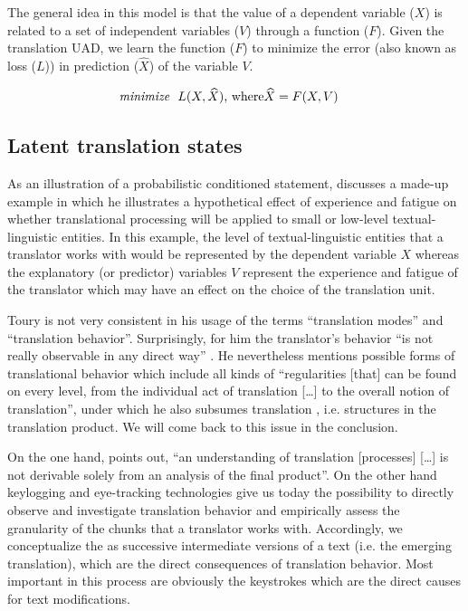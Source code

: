 \documentclass[output=paper]{LSP/langsci}
\begin{document}
The general idea in this model is that the value of a dependent variable ($X$) is related to a set of independent variables ($V$) through a function ($F$). Given the translation UAD, we learn the function ($F$) to minimize the error (also known as  loss ($L$)) in prediction ($\widehat{X}$) of the variable $V$.

	
\begin{eqnarray}
\label{carl-schaeffer:eqn:tp}
\text{\itshape minimize} ~~ L(X, \widehat {X}) \mbox{, where} & \widehat {X}  =  F(X,V)
\end{eqnarray}


\subsection{Latent translation states}
\label{carl-schaeffer:sec:2.2}

As an illustration of a probabilistic conditioned statement, \citet{Toury2004} discusses a made-up example in which he illustrates a hypothetical effect of experience and fatigue on whether translational processing will be applied to small or low-level textual-linguistic entities. In this example, the level of textual-linguistic entities that a translator works with would be represented by the dependent variable  $X$ whereas the explanatory (or predictor) variables  $V$ represent
the experience and fatigue of the translator which may have an effect on the choice of the translation unit. 

Toury is not very consistent in his usage of the terms ``translation modes'' and ``translation behavior''. Surprisingly, for him the translator's behavior ``is not really observable in any direct way'' \citep[26]{Toury2004}. He nevertheless mentions possible forms of translational behavior which include all kinds of ``regularities [that] can be found on every level, from the individual act of translation [\ldots] to the overall notion of translation'', under which he also subsumes translation , i.e. structures in the translation product. We will come back to this issue in the conclusion.

On the one hand, \citet[241]{Bernardini2001} points out, ``an understanding of translation [processes] [\ldots] is not derivable solely from an analysis of the final product''. On the other hand keylogging and eye-tracking technologies give us today the possibility to directly observe and investigate translation behavior and empirically assess the granularity of the chunks that a translator works with. Accordingly, we conceptualize the  as successive intermediate versions of a text (i.e. the emerging translation), which are the direct consequences of translation behavior. Most important in this process are obviously the keystrokes which are the direct causes for text modifications. 
\end{document}
